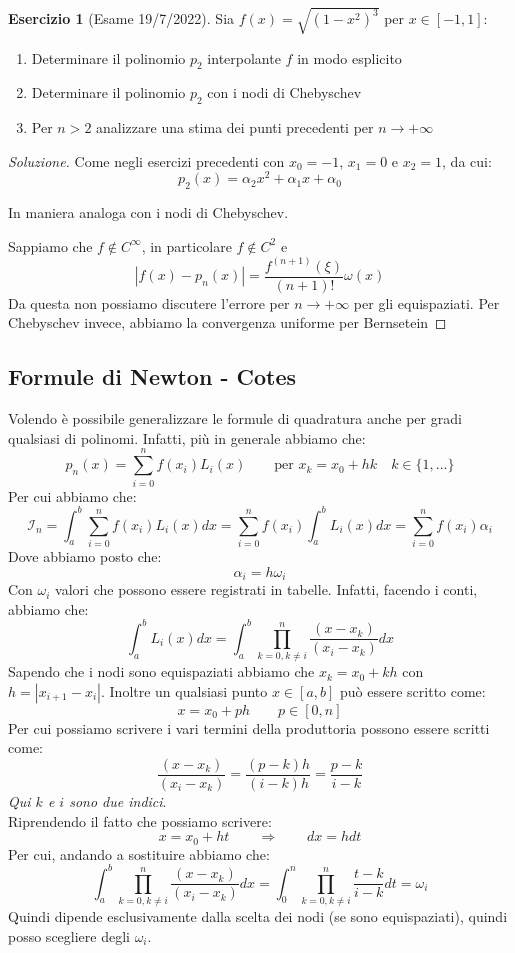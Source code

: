 \documentclass[11pt,a4paper,twoside]{article}
\theoremstyle{definition}
\newtheorem*{ese}{Esercizio}
\newenvironment{sol}
	{\renewcommand\qedsymbol{$\blacksquare$}\begin{proof}[Soluzione]}
	{\end{proof}}
\begin{document}
\begin{ese}[Esame 19/7/2022]
	Sia $f(x) = \sqrt{(1-x^2)^3}$ per $x \in [-1,1]$:
	\begin{enumerate}
		\item Determinare il polinomio $p_2$ interpolante $f$ in modo esplicito
		\item Determinare il polinomio $p_2$ con i nodi di Chebyschev
		\item Per $n>2$ analizzare una stima dei punti precedenti per $n \to + \infty$
	\end{enumerate}
\end{ese}

\begin{sol}
	 Come negli esercizi precedenti con $x_0 = -1$, $x_1 = 0$ e $x_2 = 1$, da cui:
	\[ p_2(x) = \alpha_2 x^2 + \alpha_1 x + \alpha_0 \]

	 In maniera analoga con i nodi di Chebyschev.

	 Sappiamo che $f \not \in C^\infty$, in particolare $f \not \in C^2$ e
	\[ |f(x) - p_n(x)| = \frac{f^{(n+1)}(\xi)}{(n+1)!} \omega(x) \]
	Da questa non possiamo discutere l'errore per $n \to +\infty$ per gli equispaziati. Per Chebyschev invece, abbiamo la convergenza uniforme per Bernsetein
\end{sol}

\subsection{Formule di Newton - Cotes}

Volendo è possibile generalizzare le formule di quadratura anche per gradi qualsiasi di polinomi. Infatti, più in generale abbiamo che:
\[ p_n(x) = \sum_{i = 0}^n f(x_i)L_i(x) \qquad \text{per }x_k = x_0 + hk \quad k \in \{1,...\} \]
Per cui abbiamo che:
\[\mathcal I_{n} = \int_a^b \sum_{i = 0}^n f(x_i)L_i(x)dx = \sum_{i = 0}^n f(x_i) \int_a^b L_i(x)dx = \sum_{i = 0}^n f(x_i)\alpha_i\]
Dove abbiamo posto che:
\[ \alpha_i = h\omega_i \]
Con $\omega_i$ valori che possono essere registrati in tabelle. Infatti, facendo i conti, abbiamo che:
\[ \int_a^b L_i(x)dx = \int_a^b \prod_{k = 0, k \neq i}^n \frac{(x-x_k)}{(x_i-x_k)}dx \]
Sapendo che i nodi sono equispaziati abbiamo che $x_k = x_0 + kh$ con $h = |x_{i+1} - x_i|$. Inoltre un qualsiasi punto $x \in [a,b]$ può essere scritto come:
\[ x = x_0 + ph \qquad p \in [0,n] \]
Per cui possiamo scrivere i vari termini della produttoria possono essere scritti come:
\[ \frac{(x-x_k)}{(x_i - x_k)} = \frac{(p-k)h}{(i-k)h} = \frac{p-k}{i-k} \]
\textit{Qui $k$ e $i$ sono due indici}.\\
Riprendendo il fatto che possiamo scrivere:
\[ x = x_0 + ht \qquad \Rightarrow \qquad dx = hdt \]
Per cui, andando a sostituire abbiamo che:
\[ \int_a^b \prod_{k = 0, k \neq i}^n \frac{(x-x_k)}{(x_i-x_k)}dx = \int_0^n \prod_{k = 0, k \neq i}^n \frac{t-k}{i-k} dt  = \omega_i\]
Quindi dipende esclusivamente dalla scelta dei nodi (se sono equispaziati), quindi posso scegliere degli $\omega_i$.
\end{document}
